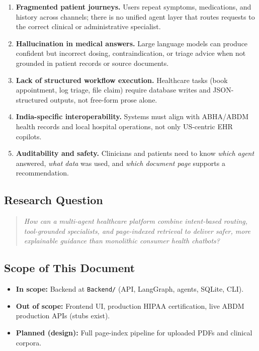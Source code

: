\documentclass[12pt,a4paper]{article}
\begin{document}
\begin{enumerate}[leftmargin=*]
    \item \textbf{Fragmented patient journeys.} Users repeat symptoms, medications, and history across channels; there is no unified agent layer that routes requests to the correct clinical or administrative specialist.
    \item \textbf{Hallucination in medical answers.} Large language models can produce confident but incorrect dosing, contraindication, or triage advice when not grounded in patient records or source documents.
    \item \textbf{Lack of structured workflow execution.} Healthcare tasks (book appointment, log triage, file claim) require database writes and JSON-structured outputs, not free-form prose alone.
    \item \textbf{India-specific interoperability.} Systems must align with ABHA/ABDM health records and local hospital operations, not only US-centric EHR copilots.
    \item \textbf{Auditability and safety.} Clinicians and patients need to know \emph{which agent} answered, \emph{what data} was used, and \emph{which document page} supports a recommendation.
\end{enumerate}

\subsection{Research Question}

\begin{quote}
\textit{How can a multi-agent healthcare platform combine intent-based routing, tool-grounded specialists, and page-indexed retrieval to deliver safer, more explainable guidance than monolithic consumer health chatbots?}
\end{quote}

\subsection{Scope of This Document}

\begin{itemize}[noitemsep]
    \item \textbf{In scope:} Backend at \texttt{Backend/} (API, LangGraph, agents, SQLite, CLI).
    \item \textbf{Out of scope:} Frontend UI, production HIPAA certification, live ABDM production APIs (stubs exist).
    \item \textbf{Planned (design):} Full page-index pipeline for uploaded PDFs and clinical corpora.
\end{itemize}
\end{document}
